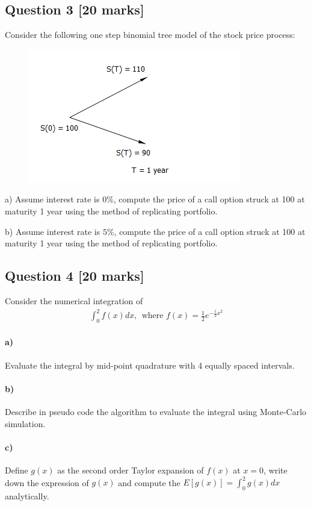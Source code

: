 \documentclass[11pt,a4paper,hidelinks,fleqn]{article}            %
\begin{document}
\subsection*{Question 3 [20 marks]}
Consider the following one step binomial tree model of the stock price process:
\begin{figure}[h]
\includegraphics[scale=0.9]{./4}
\end{figure}

a) Assume interest rate is $0\%$, compute the price of a call option struck at 100 at maturity 1 year using the method of replicating portfolio.

b) Assume interest rate is $5\%$, compute the price of a call option struck at 100 at maturity 1 year using the method of replicating portfolio.


\subsection*{Question 4 [20 marks]} 
Consider the numerical integration of 
\begin{align*}
\int_0^{2} f(x) dx, ~~\text{where~} f(x) = \frac{1}{2} e^{-\frac12x^2}
\end{align*}

\paragraph{a)} Evaluate the integral by mid-point quadrature with 4 equally spaced intervals. 

\paragraph{b)} Describe in pseudo code the algorithm to evaluate the integral using Monte-Carlo simulation.

\paragraph{c)} Define $g(x)$ as the second order Taylor 
expansion of $f(x)$ at $x=0$, write down the expression of $g(x)$ and compute the $E[g(x)] = \int_0^2 g(x) dx$ analytically.
\end{document}
